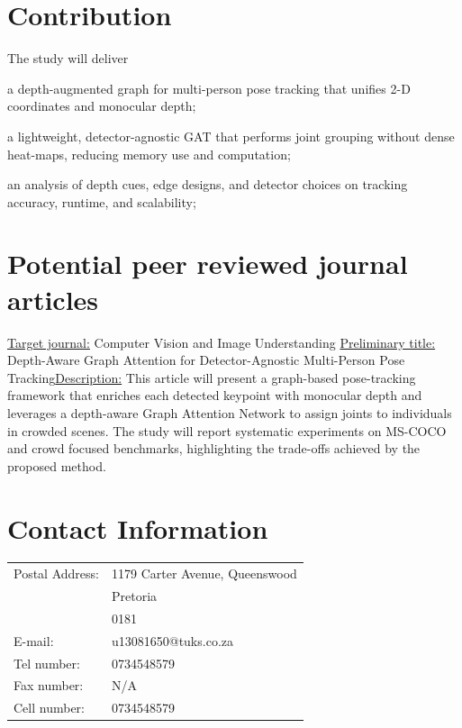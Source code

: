 \section{Contribution}

The study will deliver
\begin{compactitem}
    \item a depth-augmented graph for multi-person pose tracking that unifies 2-D coordinates and monocular depth;
    \item a lightweight, detector-agnostic GAT that performs joint grouping without dense heat-maps, reducing memory use and computation;
    \item an analysis of depth cues, edge designs, and detector choices on tracking accuracy, runtime, and scalability;
\end{compactitem}

\section{Potential peer reviewed journal articles} \underline{Target journal:}
Computer Vision and Image Understanding \newline \underline{Preliminary title:}
Depth-Aware Graph Attention for Detector-Agnostic Multi-Person Pose
Tracking\newline \underline{Description:} This article will present a
graph-based pose-tracking framework that enriches each detected keypoint with
monocular depth and leverages a depth-aware Graph Attention Network to assign
joints to individuals in crowded scenes. The study will report systematic
experiments on MS-COCO and crowd focused benchmarks, highlighting the
trade-offs achieved by the proposed method. \newline

\newpage

\section*{Contact Information}

\begin{center}
\begin{tabular}{lp{11.5cm}}
  Postal Address:   & 1179 Carter Avenue, Queenswood \\
                    & Pretoria \\
                    & 0181 \\[1.2ex]
  E-mail:           & u13081650@tuks.co.za \\[1.2ex]
  Tel number:       & 0734548579 \\[1.2ex]
  Fax number:       & N/A \\[1.2ex]
  Cell number:      & 0734548579 \\
\end{tabular}
\end{center}